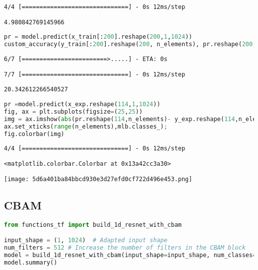 \begin{lstlisting}
4/4 [==============================] - 0s 12ms/step
\end{lstlisting}

\begin{lstlisting}
4.980842769145966
\end{lstlisting}

\begin{lstlisting}[language=Python]
pr = model.predict(x_train[:200].reshape(200,1,1024))
custom_accuracy(y_train[:200].reshape(200, n_elements), pr.reshape(200, n_elements)).numpy()*100
\end{lstlisting}

\begin{lstlisting}
6/7 [========================>.....] - ETA: 0s
\end{lstlisting}

\begin{lstlisting}
7/7 [==============================] - 0s 12ms/step
\end{lstlisting}

\begin{lstlisting}
20.342612266540527
\end{lstlisting}

\begin{lstlisting}[language=Python]
pr =model.predict(x_exp.reshape(114,1,1024))
fig, ax = plt.subplots(figsize=(25,25))
img = ax.imshow(abs(pr.reshape(114,n_elements)- y_exp.reshape(114,n_elements)), cmap='hot')
ax.set_xticks(range(n_elements),mlb.classes_);
fig.colorbar(img)
\end{lstlisting}

\begin{lstlisting}
4/4 [==============================] - 0s 12ms/step
\end{lstlisting}

\begin{lstlisting}
<matplotlib.colorbar.Colorbar at 0x13a42cc3a30>
\end{lstlisting}

\texttt{[image: 5d6a401ba84bbcd930e3d27efd0cf722d496e453.png]}

\hypertarget{cbam}{%
\subsection{CBAM}\label{cbam}}

\begin{lstlisting}[language=Python]
from functions_tf import build_1d_resnet_with_cbam

input_shape = (1, 1024)  # Adapted input shape
num_filters = 512 # Increase the number of filters in the CBAM block
model = build_1d_resnet_with_cbam(input_shape=input_shape, num_classes=n_elements, num_filters=num_filters, res_block_num=3, output_shape=(1,n_elements))
model.summary()
\end{lstlisting}

